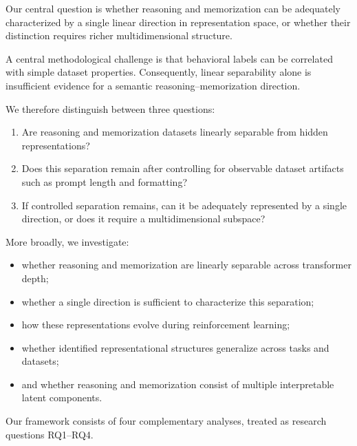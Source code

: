 \documentclass[11pt]{article}
\begin{document}
Our central question is whether reasoning and memorization can be
adequately characterized by a single linear direction in
representation space, or whether their distinction requires richer
multidimensional structure.

A central methodological challenge is that behavioral labels can be
correlated with simple dataset properties. Consequently, linear
separability alone is insufficient evidence for a semantic
reasoning--memorization direction.

We therefore distinguish between three questions:

\begin{enumerate}

    \item Are reasoning and memorization datasets linearly separable
    from hidden representations?

    \item Does this separation remain after controlling for observable
    dataset artifacts such as prompt length and formatting?

    \item If controlled separation remains, can it be adequately
    represented by a single direction, or does it require a
    multidimensional subspace?

\end{enumerate}

More broadly, we investigate:

\begin{itemize}

    \item whether reasoning and memorization are linearly separable
    across transformer depth;

    \item whether a single direction is sufficient to characterize
    this separation;

    \item how these representations evolve during reinforcement
    learning;

    \item whether identified representational structures generalize
    across tasks and datasets;

    \item and whether reasoning and memorization consist of multiple
    interpretable latent components.

\end{itemize}

Our framework consists of four complementary analyses, treated as
research questions RQ1--RQ4.
\end{document}
